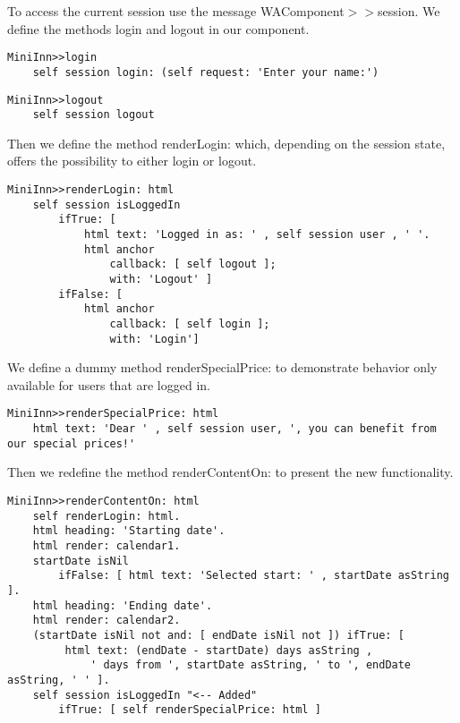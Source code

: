 \documentclass[a4paper,10pt,twoside]{book}
\newcommand{\ct}[1]{{\small\ttfamily\textup{#1}}}
\begin{document}
To access the current session use the message  \ct{WAComponent$>$$>$session}.  We define the methods \ct{login} and \ct{logout} in our component.

\begin{lstlisting}
MiniInn>>login
    self session login: (self request: 'Enter your name:')
\end{lstlisting}

\begin{lstlisting}
MiniInn>>logout
    self session logout
\end{lstlisting}

Then we define the method \ct{renderLogin:} which, depending on the session state, offers the possibility to either login or logout.

\begin{lstlisting}
MiniInn>>renderLogin: html
    self session isLoggedIn
        ifTrue: [
            html text: 'Logged in as: ' , self session user , ' '.
            html anchor
                callback: [ self logout ];
                with: 'Logout' ]
        ifFalse: [
            html anchor
                callback: [ self login ];
                with: 'Login']
\end{lstlisting}

We define a dummy method \ct{renderSpecialPrice:} to demonstrate behavior only available for users that are logged in.

\begin{lstlisting}
MiniInn>>renderSpecialPrice: html
    html text: 'Dear ' , self session user, ', you can benefit from our special prices!'
\end{lstlisting}

Then we redefine the method \ct{renderContentOn:} to present the new functionality.

\begin{lstlisting}
MiniInn>>renderContentOn: html
    self renderLogin: html.
    html heading: 'Starting date'.
    html render: calendar1.
    startDate isNil
        ifFalse: [ html text: 'Selected start: ' , startDate asString ].
    html heading: 'Ending date'.
    html render: calendar2.
    (startDate isNil not and: [ endDate isNil not ]) ifTrue: [
         html text: (endDate - startDate) days asString ,
             ' days from ', startDate asString, ' to ', endDate asString, ' ' ].
    self session isLoggedIn "<-- Added"
        ifTrue: [ self renderSpecialPrice: html ]
\end{lstlisting}
\end{document}
